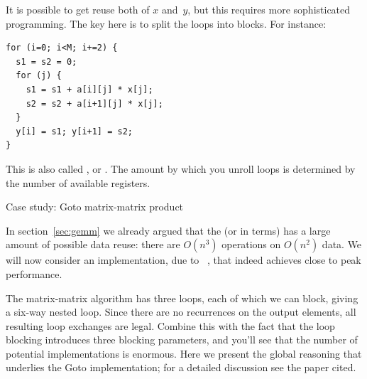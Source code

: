 It is possible to get reuse both of $x$ and~$y$, but this requires
more sophisticated programming. The key here is to split the loops into
blocks. For instance:
\begin{verbatim}
for (i=0; i<M; i+=2) {
  s1 = s2 = 0;
  for (j) {
    s1 = s1 + a[i][j] * x[j];
    s2 = s2 + a[i+1][j] * x[j];
  }
  y[i] = s1; y[i+1] = s2;
}
\end{verbatim}
This is also called ,
or . The amount by which you unroll
loops is determined by the number of available registers.

 {Case study: Goto matrix-matrix product}
\label{sec:goto-gemm}

In section~\ref{sec:gemm} we already argued that the  (or  in  terms) has a large amount of
possible data reuse: there are $O(n^3)$ operations on $O(n^2)$ data.
We will now consider an implementation, due
to ~\cite{GotoGeijn:2008:Anatomy}, that
indeed achieves close to peak performance.

The matrix-matrix algorithm has three loops, each of which we can block,
giving a six-way nested loop.
Since there are no recurrences on the output elements, all resulting
loop exchanges are legal. Combine this with the fact that the loop blocking
introduces three blocking parameters, and you'll see that the number of
potential implementations is enormous. Here we present the global reasoning
that underlies the Goto implementation; for a detailed discussion see the paper cited.

